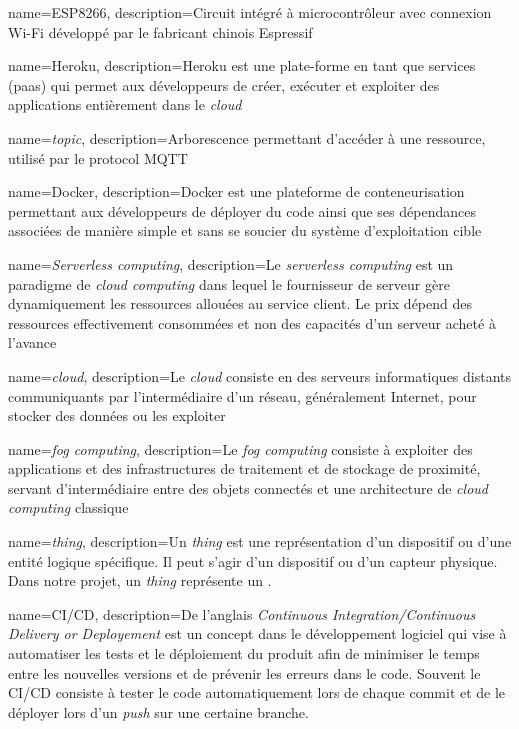 {
    name=ESP8266,
    description={Circuit intégré à microcontrôleur avec connexion Wi-Fi développé par le fabricant chinois Espressif}
}

{
    name=Heroku,
    description={Heroku est une plate-forme en tant que services (\acrshort{paas}) qui permet aux développeurs de créer, exécuter et exploiter des applications entièrement dans le \emph{cloud}}
}

{
    name=\emph{topic},
    description={Arborescence permettant d'accéder à une ressource, utilisé par le protocol MQTT}
}

{
    name=Docker,
    description={Docker est une plateforme de conteneurisation permettant aux développeurs de déployer du code ainsi que ses dépendances associées de manière simple et sans se soucier du système d'exploitation cible}
}

{
    name={\emph{Serverless computing}},
    description={Le \emph{serverless computing} est un paradigme de \emph{cloud computing} dans lequel le fournisseur de serveur gère dynamiquement les ressources allouées au service client. Le prix dépend des ressources effectivement consommées et non des capacités d'un serveur acheté à l'avance \cite{wiki-serverless}}
}

{
    name=\emph{cloud},
    description={Le \emph{cloud} consiste en des serveurs informatiques distants communiquants par l'intermédiaire d'un réseau, généralement Internet, pour stocker des données ou les exploiter \cite{wiki-cloud}}
}

{
    name={\emph{fog computing}},
    description={Le \emph{fog computing} consiste à exploiter des applications et des infrastructures de traitement et de stockage de proximité, servant d'intermédiaire entre des objets connectés et une architecture de \emph{cloud computing} classique \cite{wiki-fog-computing}}
}

{
    name={\emph{thing}},
    description={Un \emph{thing} est une représentation d'un dispositif ou d'une entité logique spécifique. Il peut s'agir d'un dispositif ou d'un capteur physique. Dans notre projet, un \emph{thing} représente un \uc{}.}
}

{
    name={CI/CD},
    description={De l'anglais \emph{Continuous Integration/Continuous Delivery or Deployement} est un concept dans le développement logiciel qui vise à automatiser les tests et le déploiement du produit afin de minimiser le temps entre les nouvelles versions et de prévenir les erreurs dans le code. Souvent le CI/CD consiste à tester le code automatiquement lors de chaque commit et de le déployer lors d'un \emph{push} sur une certaine branche.}
}